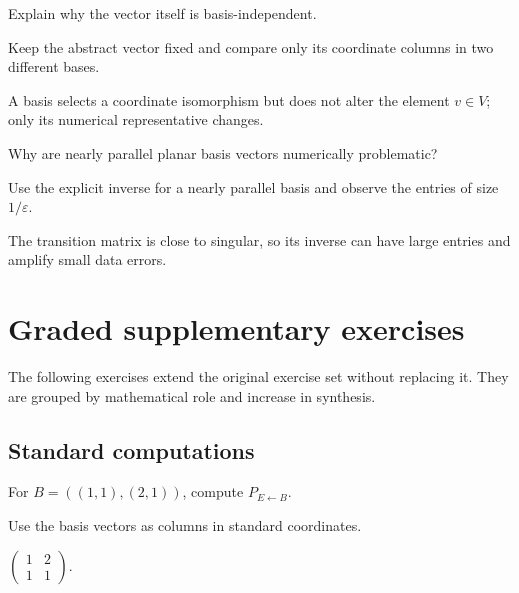 \begin{exercise}\label{exr:i04-07}
Explain why the vector itself is basis-independent.
\end{exercise}
\begin{hint}
Keep the abstract vector fixed and compare only its coordinate columns in two different bases.
\end{hint}
\begin{solution}
A basis selects a coordinate isomorphism but does not alter the element $v\in V$; only its numerical representative changes.
\end{solution}

\begin{exercise}\label{exr:i04-08}
Why are nearly parallel planar basis vectors numerically problematic?
\end{exercise}
\begin{hint}
Use the explicit inverse for a nearly parallel basis and observe the entries of size \(1/\varepsilon\).
\end{hint}
\begin{solution}
The transition matrix is close to singular, so its inverse can have large entries and amplify small data errors.
\end{solution}


\section{Graded supplementary exercises}
The following exercises extend the original exercise set without replacing it. They are grouped by mathematical role and increase in synthesis.

\subsection*{Standard computations}

\begin{exercise}\label{exr:i04-expand-01}
For \(B=((1,1),(2,1))\), compute \(P_{E\leftarrow B}\).
\end{exercise}
\begin{hint}
Use the basis vectors as columns in standard coordinates.
\end{hint}
\begin{solution}
\(\begin{pmatrix}1&2\\1&1\end{pmatrix}\).
\end{solution}

